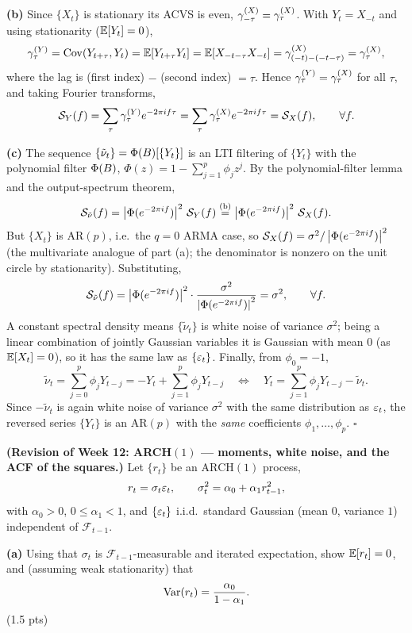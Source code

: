 \documentclass[11pt]{article}
\begin{document}
\textbf{(b)} Since $\{X_t\}$ is stationary its ACVS is even, $\gamma^{(X)}_{-\tau}=\gamma^{(X)}_\tau$. With $Y_t=X_{-t}$ and using stationarity ($\mathbb{E}[Y_t]=0$),
\[
\gamma^{(Y)}_\tau=\operatorname{Cov}(Y_{t+\tau},Y_t)=\mathbb{E}[Y_{t+\tau}Y_t]
=\mathbb{E}[X_{-t-\tau}X_{-t}]=\gamma^{(X)}_{(-t)-(-t-\tau)}=\gamma^{(X)}_{\tau} ,
\]
where the lag is (first index) $-$ (second index) $=\tau$. Hence $\gamma^{(Y)}_\tau=\gamma^{(X)}_\tau$ for all $\tau$, and taking Fourier transforms,
\[
\mathcal{S}_Y(f)=\sum_\tau\gamma^{(Y)}_\tau e^{-2\pi i f\tau}
=\sum_\tau\gamma^{(X)}_\tau e^{-2\pi i f\tau}=\mathcal{S}_X(f),\qquad\forall f .
\]

\textbf{(c)} The sequence $\{\tilde\nu_t\}=\Phi(B)[\{Y_t\}]$ is an LTI filtering of $\{Y_t\}$ with the polynomial filter $\Phi(B)$, $\Phi(z)=1-\sum_{j=1}^p\phi_j z^j$. By the polynomial-filter lemma and the output-spectrum theorem,
\[
\mathcal{S}_{\tilde\nu}(f)=\left\lvert \Phi(e^{-2\pi i f}) \right\rvert^2\,\mathcal{S}_Y(f)
\overset{\text{(b)}}{=}\left\lvert \Phi(e^{-2\pi i f}) \right\rvert^2\,\mathcal{S}_X(f).
\]
But $\{X_t\}$ is AR$(p)$, i.e.\ the $q=0$ ARMA case, so $\mathcal{S}_X(f)=\sigma^2/\left\lvert \Phi(e^{-2\pi i f}) \right\rvert^2$ (the multivariate analogue of part (a); the denominator is nonzero on the unit circle by stationarity). Substituting,
\[
\mathcal{S}_{\tilde\nu}(f)=\left\lvert \Phi(e^{-2\pi i f}) \right\rvert^2\cdot
\frac{\sigma^2}{\left\lvert \Phi(e^{-2\pi i f}) \right\rvert^2}=\sigma^2,\qquad\forall f .
\]
A constant spectral density means $\{\tilde\nu_t\}$ is white noise of variance $\sigma^2$; being a linear combination of jointly Gaussian variables it is Gaussian with mean $0$ (as $\mathbb{E}[X_t]=0$), so it has the same law as $\{\varepsilon_t\}$. Finally, from $\phi_0=-1$,
\[
\tilde\nu_t=\sum_{j=0}^p\phi_j Y_{t-j}=-Y_t+\sum_{j=1}^p\phi_j Y_{t-j}
\quad\Longleftrightarrow\quad
Y_t=\sum_{j=1}^p\phi_j Y_{t-j}-\tilde\nu_t .
\]
Since $-\tilde\nu_t$ is again white noise of variance $\sigma^2$ with the same distribution as $\varepsilon_t$, the reversed series $\{Y_t\}$ is an AR$(p)$ with the \emph{same} coefficients $\phi_1,\dots,\phi_p$. \hfill$\square$

\statementstart
\textbf{(Revision of Week 12: ARCH$(1)$ --- moments, white noise, and the ACF of the squares.)} Let $\{r_t\}$ be an $\mathrm{ARCH}(1)$ process,
\[
r_t=\sigma_t\varepsilon_t,\qquad \sigma_t^2=\alpha_0+\alpha_1 r_{t-1}^2,
\]
with $\alpha_0>0$, $0\le\alpha_1<1$, and $\{\varepsilon_t\}$ i.i.d.\ standard Gaussian (mean $0$, variance $1$) independent of $\mathcal F_{t-1}$.

\textbf{(a)} Using that $\sigma_t$ is $\mathcal F_{t-1}$-measurable and iterated expectation, show $\mathbb{E}[r_t]=0$, and (assuming weak stationarity) that
\[
\operatorname{Var}(r_t)=\frac{\alpha_0}{1-\alpha_1}.
\]
\hfill(1.5 pts)
\end{document}

